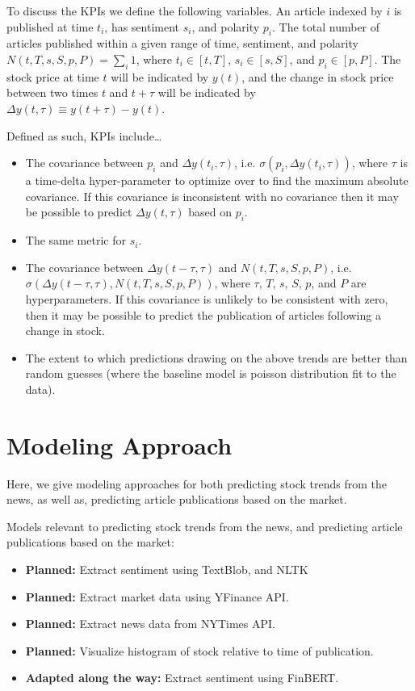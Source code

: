 \documentclass{article}
\begin{document}
To discuss the KPIs we define the following variables.
An article indexed by $i$ is published at time $t_i$, has sentiment $s_i$, and polarity $p_i$.
The total number of articles published within a given range of time, sentiment, and polarity $N( t, T, s, S, p, P) = \sum_i 1$, where $t_i \in [ t, T ]$, $s_i \in [ s, S ]$, and $p_i \in [ p, P ]$.
The stock price at time $t$ will be indicated by $y(t)$,
and the change in stock price between two times $t$ and $t + \tau$ will be indicated by $\Delta y(t,\tau) \equiv y(t + \tau) - y(t)$.

Defined as such, KPIs include\ldots
\begin{itemize}
    \item The covariance between $p_i$ and $\Delta y(t_i,\tau)$, i.e. $\sigma( p_i, \Delta y(t_i, \tau))$, where $\tau$ is a time-delta hyper-parameter to optimize over to find the maximum absolute covariance. If this covariance is inconsistent with no covariance then it may be possible to predict $\Delta y(t, \tau)$ based on $p_i$.
    \item The same metric for $s_i$.
    \item The covariance between $\Delta y(t-\tau, \tau)$ and $N(t, T, s, S, p, P )$, i.e. $\sigma( \Delta y(t-\tau, \tau), N(t, T, s, S, p, P ))$, where $\tau$, $T$, $s$, $S$, $p$, and $P$ are hyperparameters. If this covariance is unlikely to be consistent with zero, then it may be possible to predict the publication of articles following a change in stock.
    \item The extent to which predictions drawing on the above trends are better than random guesses (where the baseline model is poisson distribution fit to the data).
\end{itemize}

\section*{Modeling Approach}
Here, we give modeling approaches for both predicting stock trends from the news, as well as, predicting article publications based on the market.

\vspace{0.1 in}

{Models relevant to predicting stock trends from the news, and predicting article publications based on the market:}
\begin{itemize}
    \item \textbf{Planned:} Extract sentiment using TextBlob, and NLTK 
    \item \textbf{Planned:} Extract market data using YFinance API.
    \item \textbf{Planned:} Extract news data from NYTimes API.
    \item \textbf{Planned:} Visualize histogram of stock relative to time of publication.
    \item \textbf{Adapted along the way:} Extract sentiment using FinBERT.
\end{itemize}
\end{document}
